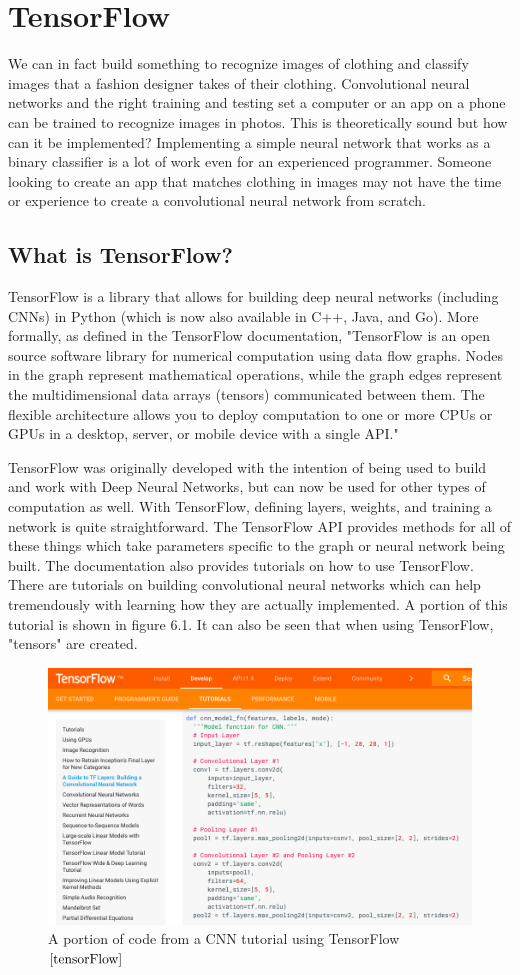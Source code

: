 \documentclass[12pt]{report} %
\begin{document}
\chapter{TensorFlow}
	We can in fact build something to recognize images of clothing and classify images that a fashion designer takes of their clothing. Convolutional neural networks and the right training and testing set a computer or an app on a phone can be trained to recognize images in photos. This is theoretically sound but how can it be implemented? Implementing a simple neural network that works as a binary classifier is a lot of work even for an experienced programmer. Someone looking to create an app that matches clothing in images may not have the time or experience to create a convolutional neural network from scratch. 
\section{What is TensorFlow?}
	TensorFlow is a library that allows for building deep neural networks (including CNNs) in Python (which is now also available in C++, Java, and Go). More formally, as defined in the TensorFlow documentation,  "TensorFlow is an open source software library for numerical computation using data flow graphs. Nodes in the graph represent mathematical operations, while the graph edges represent the multidimensional data arrays (tensors) communicated between them. The flexible architecture allows you to deploy computation to one or more CPUs or GPUs in a desktop, server, or mobile device with a single API."\cite{tensorFlow}
	
	TensorFlow was originally developed with the intention of being used to build and work with Deep Neural Networks, but can now be used for other types of computation as well. With TensorFlow, defining layers, weights, and training a network is quite straightforward. The TensorFlow API provides methods for all of these things which take parameters specific to the graph or neural network being built. The documentation also provides tutorials on how to use TensorFlow. There are tutorials on building convolutional neural networks which can help tremendously with learning how they are actually implemented. A portion of this tutorial is shown in figure 6.1. It can also be seen that when using TensorFlow, "tensors" are created.\cite{tensorFlow}
\begin{figure}
\centering
\includegraphics[width=5in]{tensorflow_cnn}
\caption{A portion of code from a  CNN tutorial using TensorFlow$\cite{tensorFlow}$}
\end{figure}	
\end{document}
